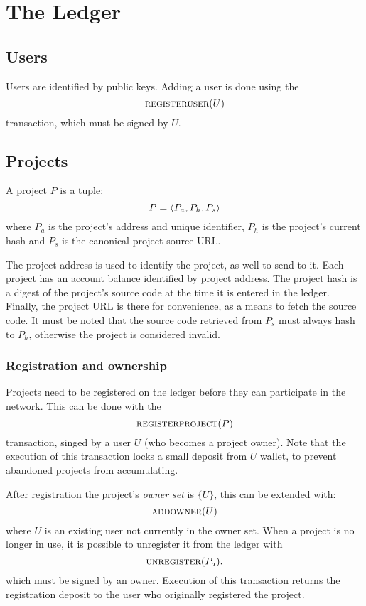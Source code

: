 \section{The \oscoin{} Ledger}

\subsection{Users}

Users are identified by public keys. Adding a user is done using the
\[
    \text{\normalfont\scshape registeruser}\small{\lparen U\rparen}
\]
transaction, which must be signed by $U$.

\subsection{Projects}
\label{s:projects}

A project $P$ is a tuple:
\[
    P = \langle P_{a}, P_h, P_s\rangle
\]
where $P_{a}$ is the project's address and unique identifier, $P_h$ is
the project's current hash and $P_s$ is the canonical project source URL.

The project address is used to identify the project, as well to send
\oscoin{} to it. Each project has an account balance identified by project
address. The project hash is a digest of the project's source code at the time
it is entered in the ledger. Finally,
the project URL is there for convenience, as a means to fetch the source code.
It must be noted that the source code retrieved from $P_s$ must always hash to
$P_h$, otherwise the project is considered invalid.

\subsubsection{Registration and ownership} Projects need to be
registered on the ledger before they can participate in the
network. This can be done with the
\[
    \text{\normalfont\scshape registerproject}\small{\lparen P\rparen}
\]
transaction, singed by a user $U$ (who becomes a project owner). Note
that the execution of this transaction locks a small \oscoin{} deposit
from $U$ wallet, to prevent abandoned projects from accumulating.

After registration the project's \emph{owner set} is $\{U\}$, this can
be extended with:
\[
    \text{\normalfont\scshape addowner}\small{\lparen U\rparen}
\]
where $U$ is an existing user not currently in the owner set.
When a project is no longer in use, it is possible to unregister it from the
ledger with
\[
    \text{\normalfont\scshape unregister}\small{\lparen P_a\rparen}.
\]
which must be signed by an owner. Execution of this transaction
returns the registration deposit to the user who originally registered
the project.

